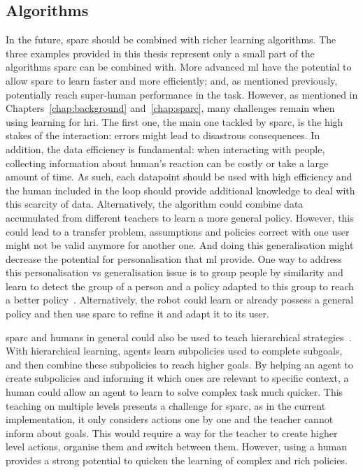 \subsection{Algorithms}

In the future, \gls{sparc} should be combined with richer learning algorithms. The three examples provided in this thesis represent only a small part of the algorithms \gls{sparc} can be combined with. More advanced \gls{ml} have the potential to allow \gls{sparc} to learn faster and more efficiently; and, as mentioned previously, potentially reach super-human performance in the task. However, as mentioned in Chapters~\ref{chap:background} and~\ref{chap:sparc}, many challenges remain when using learning for \gls{hri}. The first one, the main one tackled by \gls{sparc}, is the high stakes of the interaction: errors might lead to disastrous consequences. In addition, the data efficiency is fundamental: when interacting with people, collecting information about human's reaction can be costly or take a large amount of time. As such, each datapoint should be used with high efficiency and the human included in the loop should provide additional knowledge to deal with this scarcity of data. Alternatively, the algorithm could combine data accumulated from different teachers to learn a more general policy. However, this could lead to a transfer problem, assumptions and policies correct with one user might not be valid anymore for another one. And doing this generalisation might decrease the potential for personalisation that \gls{ml} provide. One way to address this personalisation vs generalisation issue is to group people by similarity and learn to detect the group of a person and a policy adapted to this group to reach a better policy~\citep{brunskill2014pac}. Alternatively, the robot could learn or already possess a general policy and then use \gls{sparc} to refine it and adapt it to its user. 

\gls{sparc} and humans in general could also be used to teach hierarchical strategies~\citep{barto2003recent}. With hierarchical learning, agents learn subpolicies used to complete subgoals, and then combine these subpolicies to reach higher goals. By helping an agent to create subpolicies and informing it which ones are relevant to specific context, a human could allow an agent to learn to solve complex task much quicker. This teaching on multiple levels presents a challenge for \gls{sparc}, as in the current implementation, it only considers actions one by one and the teacher cannot inform about goals. This would require a way for the teacher to create higher level actions, organise them and switch between them. However, using a human provides a strong potential to quicken the learning of complex and rich policies.

